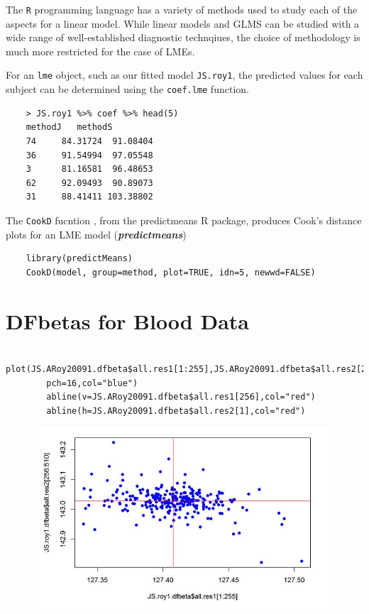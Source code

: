 \documentclass[12pt, a4paper]{report}
\theoremstyle{plain}
\theoremstyle{definition}
\theoremstyle{remark}
\begin{document}
	
	
	\newpage
	
	
	
	
The \texttt{R} programming language has a variety of methods used to study each of the aspects for a linear model. While linear models and GLMS can be studied with a wide range of well-established diagnostic technqiues, the choice of methodology is much more restricted for the case of LMEs.

For an \texttt{lme} object, such as our fitted model \texttt{JS.roy1}, the predicted values for each subject can be determined using the \texttt{coef.lme} function.
\begin{framed}
	\begin{verbatim}
	> JS.roy1 %>% coef %>% head(5)
	methodJ   methodS
	74     84.31724  91.08404
	36     91.54994  97.05548
	3      81.16581  96.48653
	62     92.09493  90.89073
	31     88.41411 103.38802
	\end{verbatim}
\end{framed}







The \texttt{CookD} fucntion , from the predictmeans R package, produces Cook’s distance plots for an LME model 
(\textbf{\textit{predictmeans}})



\begin{framed}
	\begin{verbatim}
	library(predictMeans)
	CookD(model, group=method, plot=TRUE, idn=5, newwd=FALSE)
	\end{verbatim}
\end{framed}


	\section{DFbetas for Blood Data}
	\begin{framed}
		\begin{verbatim}
		plot(JS.ARoy20091.dfbeta$all.res1[1:255],JS.ARoy20091.dfbeta$all.res2[256:510],
		pch=16,col="blue")
		abline(v=JS.ARoy20091.dfbeta$all.res1[256],col="red")
		abline(h=JS.ARoy20091.dfbeta$all.res2[1],col="red")
		\end{verbatim}
	\end{framed}
	\begin{figure}
		\centering
		\includegraphics[width=0.7\linewidth]{images/dfbetas-JS-Roy}
		\caption{}
		\label{fig:dfbetas-JS-ARoy2009}
	\end{figure}
	
\end{document}

